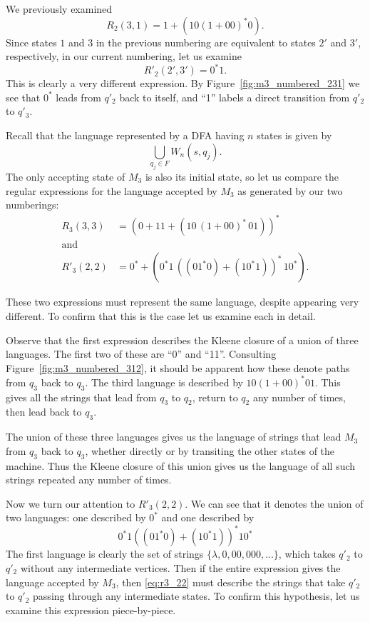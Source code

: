 \documentclass{bcthesis}
\begin{document}
		We previously examined
		\[
			R_2(3, 1) = 1 + (10 (1 + 00)^* 0).
		\]
		Since states $1$ and $3$ in the previous numbering are equivalent to states $2'$ and $3'$, respectively, in our current numbering, let us examine
		\[
			R'_2(2', 3') = 0^*1.
		\]
		This is clearly a very different expression.
		By Figure~\ref{fig:m3_numbered_231} we see that $0^*$ leads from $q'_2$ back to itself, and ``1'' labels a direct transition from $q'_2$ to $q'_3$.

		Recall that the language represented by a DFA having $n$ states is given by 
		\[
			\bigcup_{q_j \in F} W_n(s, q_j).
		\]
		The only accepting state of $M_3$ is also its initial state, so let us compare the regular expressions for the language accepted by $M_3$ as generated by our two numberings:
		\begin{align*}
			R_3(3, 3) &= (0+11+(10 \, (1+00)^* \, 01))^* \\
			\text{and} \\
			R'_3(2, 2) &= 0^* + (0^*1 \, ((01^*0) + (10^*1))^* \, 10^*).
		\end{align*}

		These two expressions must represent the same language, despite appearing very different.
		To confirm that this is the case let us examine each in detail.

		Observe that the first expression describes the Kleene closure of a union of three languages.
		The first two of these are ``0'' and ``11''.
		Consulting Figure~\ref{fig:m3_numbered_312}, it should be apparent how these denote paths from $q_3$ back to $q_3$.
		The third language is described by $10 (1+00)^* 01$.
		This gives all the strings that lead from $q_3$ to $q_2$, return to $q_2$ any number of times, then lead back to $q_3$.

		The union of these three languages gives us the language of strings that lead $M_3$ from $q_3$ back to $q_3$, whether directly or by transiting the other states of the machine. 
		Thus the Kleene closure of this union gives us the language of all such strings repeated any number of times.

		Now we turn our attention to $R'_3(2, 2)$.
		We can see that it denotes the union of two languages: one described by $0^*$ and one described by 
		\begin{equation}
		\label{eq:r3_22}
			0^*1 ((01^*0) + (10^*1))^* 10^*
		\end{equation}
		The first language is clearly the set of strings $\{ \lambda, 0, 00, 000, \dots \}$, which takes $q'_2$ to $q'_2$ without any intermediate vertices.
		Then if the entire expression gives the language accepted by $M_3$, then \ref{eq:r3_22} must describe the strings that take $q'_2$ to $q'_2$ passing through any intermediate states.
		To confirm this hypothesis, let us examine this expression piece-by-piece.
\end{document}
